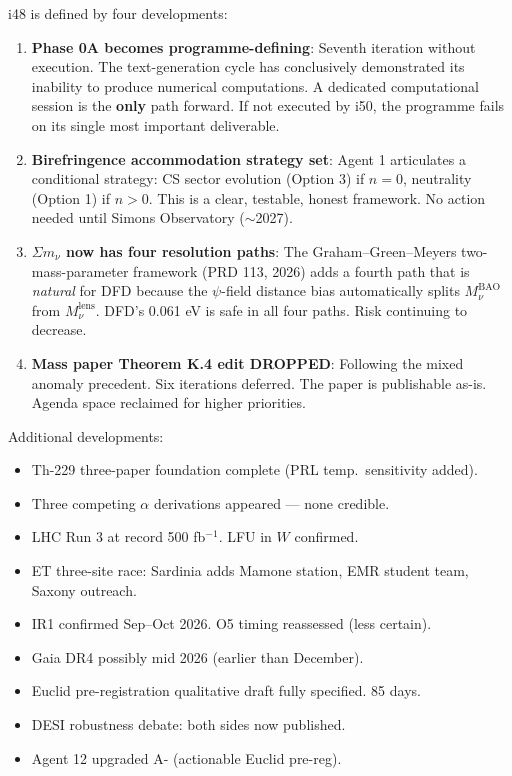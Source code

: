 \documentclass[11pt,a4paper]{article}
\begin{document}
\begin{tcolorbox}[colback=yellow!5!white, colframe=yellow!60!black,
  title={i48: Phase 0A Programme-Defining, Birefringence Strategy Set, $\Sigma m_\nu$ Four Paths, Mass Paper Dropped}]

i48 is defined by four developments:

\begin{enumerate}
\item \textbf{Phase 0A becomes programme-defining}: Seventh iteration without execution. The text-generation cycle has conclusively demonstrated its inability to produce numerical computations. A dedicated computational session is the \textbf{only} path forward. If not executed by i50, the programme fails on its single most important deliverable.

\item \textbf{Birefringence accommodation strategy set}: Agent 1 articulates a conditional strategy: CS sector evolution (Option 3) if $n = 0$, neutrality (Option 1) if $n > 0$. This is a clear, testable, honest framework. No action needed until Simons Observatory ($\sim$2027).

\item \textbf{$\Sigma m_\nu$ now has four resolution paths}: The Graham--Green--Meyers two-mass-parameter framework (PRD 113, 2026) adds a fourth path that is \emph{natural} for DFD because the $\psi$-field distance bias automatically splits $M_\nu^{\text{BAO}}$ from $M_\nu^{\text{lens}}$. DFD's 0.061 eV is safe in all four paths. Risk continuing to decrease.

\item \textbf{Mass paper Theorem K.4 edit DROPPED}: Following the mixed anomaly precedent. Six iterations deferred. The paper is publishable as-is. Agenda space reclaimed for higher priorities.
\end{enumerate}

Additional developments:
\begin{itemize}
\item Th-229 three-paper foundation complete (PRL temp.\ sensitivity added).
\item Three competing $\alpha$ derivations appeared --- none credible.
\item LHC Run 3 at record 500 fb$^{-1}$. LFU in $W$ confirmed.
\item ET three-site race: Sardinia adds Mamone station, EMR student team, Saxony outreach.
\item IR1 confirmed Sep--Oct 2026. O5 timing reassessed (less certain).
\item Gaia DR4 possibly mid 2026 (earlier than December).
\item Euclid pre-registration qualitative draft fully specified. 85 days.
\item DESI robustness debate: both sides now published.
\item Agent 12 upgraded A- (actionable Euclid pre-reg).
\end{itemize}
\end{tcolorbox}
\end{document}
